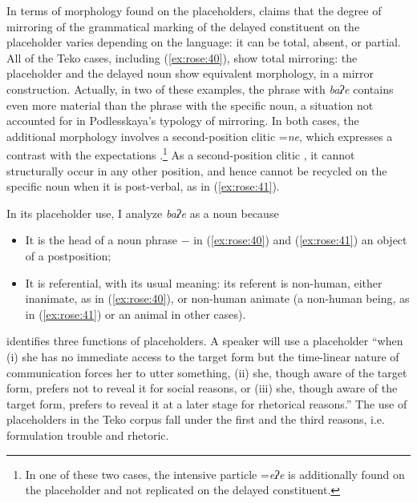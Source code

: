 \documentclass[output=paper]{langscibook}
\begin{document}
In terms of morphology found on the placeholders, \citet[18]{Podlesskaya2010} claims that the degree of mirroring of the grammatical marking of the delayed constituent on the placeholder varies depending on the language: it can be total, absent, or partial. All of the Teko cases, including (\ref{ex:rose:40}), show total mirroring: the placeholder and the delayed noun show equivalent morphology, in a mirror construction. Actually, in two of these examples, the phrase with \textit{baʔe} contains even more material than the phrase with the specific noun, a situation not accounted for in Podlesskaya’s typology of mirroring. In both cases, the additional morphology involves a second-position clitic =\textit{ne}, which expresses a contrast with the expectations \citep[398--399]{Rose2011}.\footnote{In one of these two cases, the intensive particle =\textit{eʔe} is additionally found on the placeholder and not replicated on the delayed constituent.} As a second-position clitic \citep[395--396]{Rose2011}, it cannot structurally occur in any other position, and hence cannot be recycled on the specific noun when it is post-verbal, as in (\ref{ex:rose:41}).

In its placeholder use, I analyze \textit{baʔe} as a noun because

\begin{itemize}
\item It is the head of a noun phrase $-$ in (\ref{ex:rose:40}) and (\ref{ex:rose:41}) an object of a postposition;
\item It is referential, with its usual meaning: its referent is non-human, either inanimate, as in (\ref{ex:rose:40}), or non-human animate (a non-human being, as in (\ref{ex:rose:41}) or an animal in other cases).
\end{itemize}

\citet[123]{Seraku2022} identifies three functions of placeholders. A speaker will use a placeholder “when (i) she has no immediate access to the target form but the time-linear nature of communication forces her to utter something, (ii) she, though aware of the target form, prefers not to reveal it for social reasons, or (iii) she, though aware of the target form, prefers to reveal it at a later stage for rhetorical reasons.” The use of placeholders in the Teko corpus fall under the first and the third reasons, i.e. formulation trouble and rhetoric. 
\end{document}
